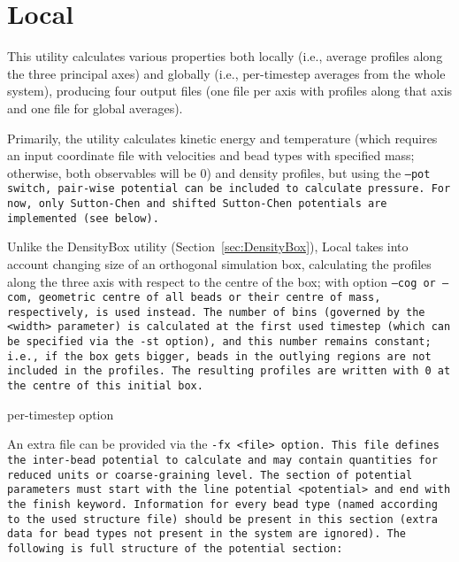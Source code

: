 \section{Local} \label{sec:Local}

This utility calculates various properties both locally (i.e., average profiles
along the three principal axes) and globally (i.e., per-timestep averages from
the whole system), producing four output files (one file per axis with profiles
along that axis and one file for global averages).

Primarily, the utility calculates kinetic energy and temperature (which requires
an input coordinate file with velocities and bead types with specified mass;
otherwise, both observables will be 0) and density profiles, but using the
\tt{--pot} switch, pair-wise potential can be included to calculate pressure.
For now, only Sutton-Chen and shifted Sutton-Chen potentials are implemented
(see below).

Unlike the DensityBox utility (Section~\ref{sec:DensityBox}), Local takes into
account changing size of an orthogonal simulation box, calculating the profiles
along the three axis with respect to the centre of the box; with option
\tt{--cog} or \tt{--com}, geometric centre of all beads or their centre of mass,
respectively, is used instead. The number of bins (governed by the \tt{<width>}
parameter) is calculated at the first used timestep (which can be specified via
the \tt{-st} option), and this number remains constant; i.e., if the box gets
bigger, beads in the outlying regions are not included in the profiles. The
resulting profiles are written with 0 at the centre of this initial box.

\TODO per-timestep option

An extra file can be provided via the \tt{-fx <file>} option. This file defines
the inter-bead potential to calculate and may contain quantities for reduced
units or coarse-graining level. The section of potential parameters must start
with the line \tt{potential <potential>} and end with the \tt{finish} keyword.
Information for every bead type (named according to the used structure file)
should be present in this section (extra data for bead types not present in the
system are ignored). The following is full structure of the \tt{potential}
section:

